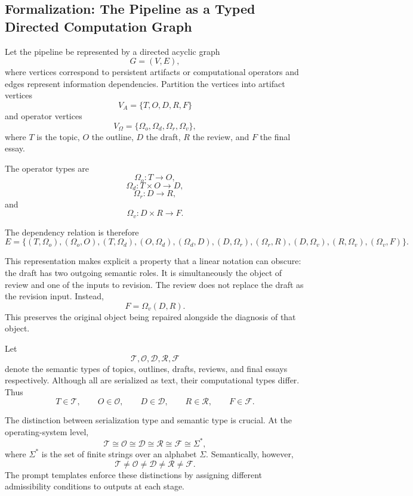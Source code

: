 \documentclass[11pt]{article}
\begin{document}
\subsection{Formalization: The Pipeline as a Typed Directed Computation Graph}

Let the pipeline be represented by a directed acyclic graph
\[
    G=(V,E),
\]
where vertices correspond to persistent artifacts or computational operators and edges represent information dependencies. Partition the vertices into artifact vertices
\[
    V_A=\{T,O,D,R,F\}
\]
and operator vertices
\[
    V_\Omega
    =
    \{\Omega_o,\Omega_d,\Omega_r,\Omega_v\},
\]
where \(T\) is the topic, \(O\) the outline, \(D\) the draft, \(R\) the review, and \(F\) the final essay.

The operator types are
\[
    \Omega_o : T \rightarrow O,
\]
\[
    \Omega_d : T\times O \rightarrow D,
\]
\[
    \Omega_r : D \rightarrow R,
\]
and
\[
    \Omega_v : D\times R \rightarrow F.
\]

The dependency relation is therefore
\[
    E =
    \{
    (T,\Omega_o),
    (\Omega_o,O),
    (T,\Omega_d),
    (O,\Omega_d),
    (\Omega_d,D),
    (D,\Omega_r),
    (\Omega_r,R),
    (D,\Omega_v),
    (R,\Omega_v),
    (\Omega_v,F)
    \}.
\]

This representation makes explicit a property that a linear notation can obscure: the draft has two outgoing semantic roles. It is simultaneously the object of review and one of the inputs to revision. The review does not replace the draft as the revision input. Instead,
\[
    F=\Omega_v(D,R).
\]
This preserves the original object being repaired alongside the diagnosis of that object.

Let
\[
    \mathcal{T},
    \mathcal{O},
    \mathcal{D},
    \mathcal{R},
    \mathcal{F}
\]
denote the semantic types of topics, outlines, drafts, reviews, and final essays respectively. Although all are serialized as text, their computational types differ. Thus
\[
    T\in\mathcal{T},
    \qquad
    O\in\mathcal{O},
    \qquad
    D\in\mathcal{D},
    \qquad
    R\in\mathcal{R},
    \qquad
    F\in\mathcal{F}.
\]

The distinction between serialization type and semantic type is crucial. At the operating-system level,
\[
    \mathcal{T}\cong\mathcal{O}\cong\mathcal{D}\cong\mathcal{R}\cong\mathcal{F}
    \cong \Sigma^\ast,
\]
where \(\Sigma^\ast\) is the set of finite strings over an alphabet \(\Sigma\). Semantically, however,
\[
    \mathcal{T}\neq\mathcal{O}\neq\mathcal{D}\neq\mathcal{R}\neq\mathcal{F}.
\]
The prompt templates enforce these distinctions by assigning different admissibility conditions to outputs at each stage.
\end{document}
